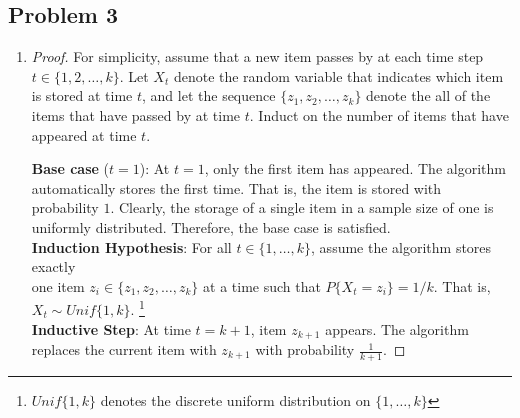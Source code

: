 \documentclass[twoside,11pt]{homework}
\begin{document}
\subsection*{Problem 3}

\begin{enumerate}[\bf (a)]

\item
\begin{proof}
For simplicity,  assume that a new item passes by at each time step $t \in \{1, 2,  \dots,  k\}$.  Let $X_t$ denote the random variable that indicates which item is stored at time $t$,  and let the sequence $\{z_1, z_2, \dots, z_k\}$ denote the all of the items that have passed by at time $t$.  Induct on the number of items that have appeared at time $t$.

\textbf{Base case} ($t=1$):  At $t=1$, only the first item has appeared.  The algorithm automatically stores the first time. That is,  the item is stored with probability $1$.  Clearly,  the storage of a single item in a sample size of one is uniformly distributed.  Therefore, the base case is satisfied. \\[0.5em]
\textbf{Induction Hypothesis}: For all $t \in \{1, \dots, k\}$, assume the algorithm stores exactly \\[0.15em]
 one item $z_i \in \{z_1, z_2, \dots, z_k \}$ at a time such that $P\{X_t = z_i\} = 1/k$. That is, \\[0.15em]$X_t \sim Unif\{1, k\}$. \footnote{$Unif\{1, k\}$ denotes the discrete uniform distribution on $\{1, \dots, k\}$}  \\[0.5em]
\textbf{Inductive Step}: At time $t = k+1$, item $z_{k+1}$ appears. The algorithm replaces the current item with $z_{k+1}$ with probability $\frac{1}{k+1}$.  


\end{proof}
\end{enumerate}
\end{document}
